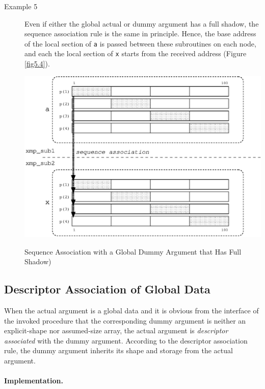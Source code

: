 \begin{description}
\item[Example 5]

	   Even if either the global actual or dummy argument has a full
	   shadow, the sequence association rule is the same in
	   principle. Hence, the base address of the local section of
	   {\tt a} is passed between these subroutines on each node, and
	   each the local section of {\tt x} starts from the received
	   address (Figure \ref{fig5.4}).

\begin{myfigure}
 \includegraphics[scale=0.7]{figs/fig5.4.eps}
 \caption{Sequence Association with a Global Dummy Argument that Has
 Full Shadow)}
 \label{fig5.4}
\end{myfigure}

\end{description}


\subsection{Descriptor Association of Global Data}

When the actual argument is a global data and it is obvious from the
interface of the invoked procedure that the corresponding dummy argument
is neither an explicit-shape nor assumed-size array, the actual
argument is {\it descriptor associated} with the dummy
argument. According to the descriptor association rule, the dummy
argument inherits its shape and storage from the actual argument.

\paragraph{Implementation.}


